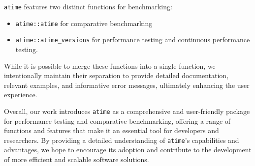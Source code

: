 \texttt{atime} features two distinct functions for benchmarking: 
\begin{itemize}
 

    \item\texttt{atime::atime} for comparative benchmarking \item\texttt{atime::atime\_versions} for performance testing and continuous performance testing. 

\end{itemize}

While it is possible to merge these functions into a single function, we intentionally maintain their separation to provide detailed documentation, relevant examples, and informative error messages, ultimately enhancing the user experience.

Overall, our work introduces \texttt{atime} as a comprehensive and user-friendly package for performance testing and comparative benchmarking, offering a range of functions and features that make it an essential tool for developers and researchers. By providing a detailed understanding of \texttt{atime}'s capabilities and advantages, we hope to encourage its adoption and contribute to the development of more efficient and scalable software solutions.









